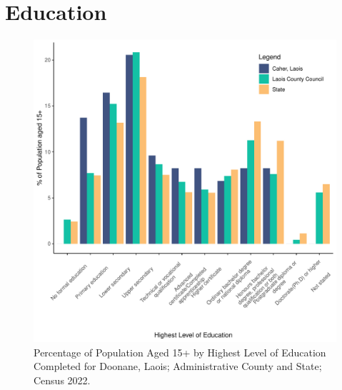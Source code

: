 \documentclass{article}
\begin{document}
\section{Education}\label{sect:Edu}
\begin{figure}[H]
	\centering
	\includegraphics[width = 120mm]{../figures/EduED.pdf}
	\caption{Percentage of Population Aged 15+ by Highest Level of Education Completed for Doonane, Laois; Administrative County and State; Census 2022.}
	\label{fig:vbnv}
	\end{figure}
\end{document}
